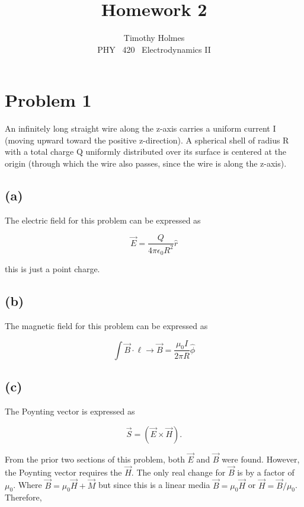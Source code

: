 \documentclass[11pt]{article}
\newcommand{\HWnum}{2}
\newcommand{\CourseNum}{420}           %
\newcommand{\Subject}{PHY}
\begin{document}

\title{Homework {\HWnum}}
\author{Timothy Holmes \\ \Subject ~ \CourseNum ~ Electrodynamics II}

\maketitle

\section*{Problem 1}
An infinitely long straight wire along the z-axis carries a uniform current I (moving upward toward the positive z-direction). A spherical shell of radius R with a total charge Q uniformly distributed over its surface is centered at the origin (through which the wire also passes, since the wire is along the z-axis).

\subsection*{(a)}
The electric field for this problem can be expressed as 

$$
\vec{E} = \frac{Q}{4\pi\epsilon_{0}R^{2}}\hat{r}
$$

this is just a point charge. 

\subsection*{(b)}
The magnetic field for this problem can be expressed as 

$$
\int \vec{B} \cdot \ell \rightarrow \vec{B} = \frac{\mu_{0} I}{2\pi R} \hat{\phi}
$$

\subsection*{(c)}

The Poynting vector is expressed as

$$
\vec{S} = (\vec{E} \times \vec{H}).
$$

From the prior two sections of this problem, both $\vec{E}$ and $\vec{B}$ were found. However, the Poynting vector requires the $\vec{H}$. The only real change for $\vec{B}$ is by a factor of $\mu_{0}$. Where $\vec{B} = \mu_{0}\vec{H} + \vec{M}$ but since this is a linear media $\vec{B} = \mu_{0}\vec{H}$ or $\vec{H} = \vec{B} / \mu_{0}$. Therefore,
\end{document}
